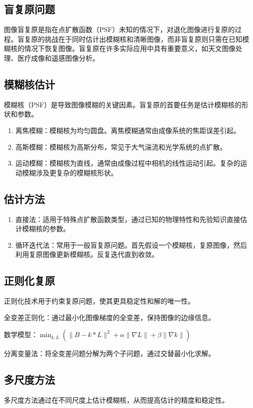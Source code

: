 \documentclass{lzureport}
\begin{document}
\subsection{盲复原问题}
图像盲复原是指在点扩散函数（PSF）未知的情况下，对退化图像进行复原的过程。盲复原的挑战在于同时估计出模糊核和清晰图像，而非盲复原则只需在已知模糊核的情况下恢复图像。盲复原在许多实际应用中具有重要意义，如天文图像处理、医疗成像和遥感图像分析。

\subsection{模糊核估计}
模糊核（PSF）是导致图像模糊的关键因素。盲复原的首要任务是估计模糊核的形状和参数。

\begin{enumerate}[label=\arabic*)]
	\item 离焦模糊：模糊核为均匀圆盘。离焦模糊通常由成像系统的焦距误差引起。
	\item 高斯模糊：模糊核为高斯分布，常见于大气湍流和光学系统的点扩散。
	\item 运动模糊：模糊核为直线，通常由成像过程中相机的线性运动引起。复杂的运动模糊涉及更复杂的模糊核形状。
\end{enumerate}

\subsection{估计方法}
\begin{enumerate}[label=\arabic*)]
	\item 直接法：适用于特殊点扩散函数类型，通过已知的物理特性和先验知识直接估计模糊核的参数。
	\item 循环迭代法：常用于一般盲复原问题。首先假设一个模糊核，复原图像，然后利用复原图像更新模糊核。反复迭代直到收敛。
\end{enumerate}

\subsection{正则化复原}
正则化技术用于约束复原问题，使其更具稳定性和解的唯一性。

全变差正则化：通过最小化图像梯度的全变差，保持图像的边缘信息。

数学模型：$\min_{k,L}\left(\|B-k*L\|^2+\alpha\|\nabla L\|+\beta\|\nabla k\|\right)$

分离变量法：将全变差问题分解为两个子问题，通过交替最小化求解。

\subsection{多尺度方法}
多尺度方法通过在不同尺度上估计模糊核，从而提高估计的精度和稳定性。
\end{document}
